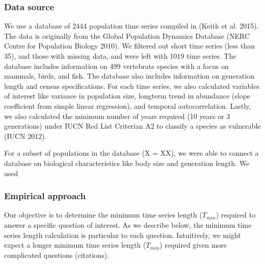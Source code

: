 \documentclass[12pt,]{article}
\begin{document}
\subsubsection{Data source}\label{data-source}

We use a database of 2444 population time series compiled in (Keith et
al. 2015). The data is originally from the Global Population Dynamics
Database (NERC Centre for Population Biology 2010). We filtered out
short time series (less than 35), and those with missing data, and were
left with 1019 time series. The database includes information on 499
vertebrate species with a focus on mammals, birds, and fish. The
database also includes information on generation length and census
specifications. For each time series, we also calculated variables of
interest like variance in population size, longterm trend in abundance
(slope coefficient from simple linear regression), and temporal
autocorrelation. Lastly, we also calculated the minimum number of years
required (10 years or 3 generations) under IUCN Red List Criterian A2 to
classify a species as vulnerable (IUCN 2012).

For a subset of populations in the database (X = XX), we were able to
connect a database on biological characteristics like body size and
generation length. We used

\subsubsection{Empirical approach}\label{empirical-approach}

Our objective is to determine the minimum time series length
(\(T_{min}\)) required to answer a specific question of interest. As we
describe below, the minimum time series length calculation is particular
to each question. Intuitively, we might expect a longer minimum time
series length (\(T_{min}\)) required given more complicated questions
(citations).
\end{document}
